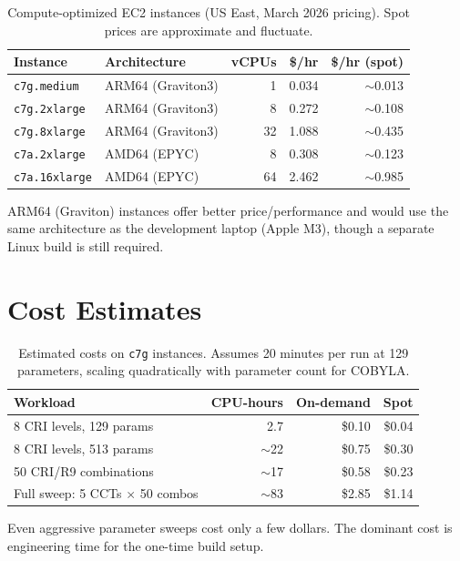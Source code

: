 \documentclass[11pt]{article}
\begin{document}
\begin{table}[h]
\centering
\begin{tabular}{@{}llrrr@{}}
\toprule
Instance & Architecture & vCPUs & \$/hr & \$/hr (spot) \\
\midrule
\texttt{c7g.medium}   & ARM64 (Graviton3) & 1  & 0.034 & $\sim$0.013 \\
\texttt{c7g.2xlarge}   & ARM64 (Graviton3) & 8  & 0.272 & $\sim$0.108 \\
\texttt{c7g.8xlarge}   & ARM64 (Graviton3) & 32 & 1.088 & $\sim$0.435 \\
\texttt{c7a.2xlarge}   & AMD64 (EPYC)      & 8  & 0.308 & $\sim$0.123 \\
\texttt{c7a.16xlarge}  & AMD64 (EPYC)      & 64 & 2.462 & $\sim$0.985 \\
\bottomrule
\end{tabular}
\caption{Compute-optimized EC2 instances (US East, March 2026 pricing).
  Spot prices are approximate and fluctuate.}
\label{tab:instances}
\end{table}

ARM64 (Graviton) instances offer better price/performance and would
use the same architecture as the development laptop (Apple M3), though
a separate Linux build is still required.

\section{Cost Estimates}

\begin{table}[h]
\centering
\begin{tabular}{@{}lrrr@{}}
\toprule
Workload & CPU-hours & On-demand & Spot \\
\midrule
8 CRI levels, 129 params     & 2.7  & \$0.10 & \$0.04 \\
8 CRI levels, 513 params     & $\sim$22  & \$0.75 & \$0.30 \\
50 CRI/R9 combinations       & $\sim$17  & \$0.58 & \$0.23 \\
Full sweep: 5 CCTs $\times$ 50 combos & $\sim$83 & \$2.85 & \$1.14 \\
\bottomrule
\end{tabular}
\caption{Estimated costs on \texttt{c7g} instances.  Assumes 20 minutes
  per run at 129 parameters, scaling quadratically with parameter count
  for COBYLA.}
\label{tab:costs}
\end{table}

Even aggressive parameter sweeps cost only a few dollars.  The
dominant cost is engineering time for the one-time build setup.
\end{document}
